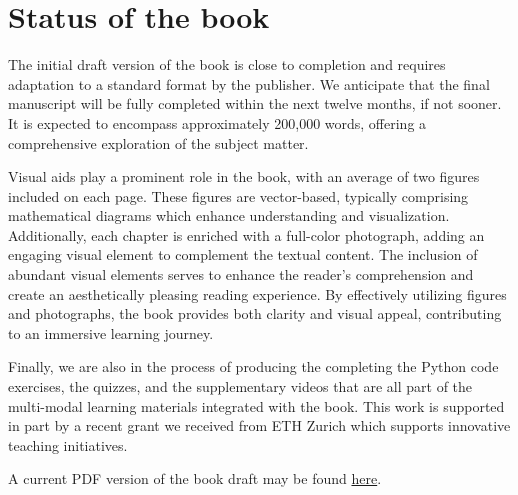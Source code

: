 \documentclass[10pt, article, one side]{memoir}
\begin{document}
    \section{Status of the book}
    The initial draft version of the book is close to completion and requires adaptation to a standard format by the publisher.
    We anticipate that the final manuscript will be fully completed within the next twelve months, if not sooner.
    It is expected to encompass approximately 200,000 words, offering a comprehensive exploration of the subject matter.

    Visual aids play a prominent role in the book, with an average of two figures included on each page.
    These figures are vector-based, typically comprising mathematical diagrams which enhance understanding and visualization.
    Additionally, each chapter is enriched with a full-color photograph, adding an engaging visual element to complement the textual content.
    The inclusion of abundant visual elements serves to enhance the reader's comprehension and create an aesthetically pleasing reading experience.
    By effectively utilizing figures and photographs, the book provides both clarity and visual appeal, contributing to an immersive learning journey.

    Finally, we are also in the process of producing the completing the Python code exercises, the quizzes, and the supplementary videos that are all part of the multi-modal learning materials integrated with the book.
    This work is supported in part by a recent grant we received from ETH Zurich which supports innovative teaching initiatives.

    A current PDF version of the book draft may be found \href{https://z7-stage-act4e-book.zuper.ai/sync/ACT4E/ACT4E/alphubel-prod/build/last/build-public/ACT4E-public.pdf}{here}.
\end{document}
